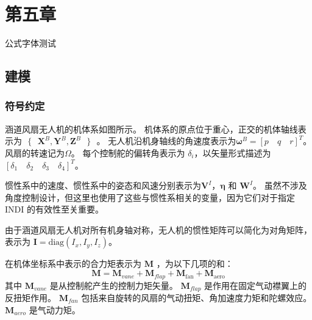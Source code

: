 \chapter{第五章}
公式字体测试

\section{建模}
\label{sec:1}
\subsection{符号约定}
涵道风扇无人机的机体系如图所示。 机体系的原点位于重心，正交的机体轴线表示为$\text{ }\!\!\{\!\!\text{ }{\boldsymbol{X}^{B}},{\boldsymbol{Y}^{B}},{\boldsymbol{Z}^{B}}\text{ }\!\!\}\!\!\text{ }$。 无人机沿机身轴线的角速度表示为${{\boldsymbol{\omega }}^{B}}=[p \quad q \quad r]^{T}$。风扇的转速记为$\Omega$。 每个控制舵的偏转角表示为 ${{\delta }_{i}}$，以矢量形式描述为$[{{\delta }_{1}} \quad {{\delta }_{2}} \quad {{\delta }_{3}} \quad {{\delta }_{4}}]^T$。



惯性系中的速度、惯性系中的姿态和风速分别表示为${{\boldsymbol{V}}^{I}}$，$\boldsymbol{\eta }$ 和 ${{\boldsymbol{W}}^{I}}$。 虽然不涉及角度控制设计，但这里也使用了这些与惯性系相关的变量，因为它们对于指定 INDI 的有效性至关重要。

由于涵道风扇无人机对所有机身轴对称，无人机的惯性矩阵可以简化为对角矩阵，表示为 $ \boldsymbol{I}=\text{diag}({{I}_{x} },{{I}_{y}},{{I}_{z}}) $。

在机体坐标系中表示的合力矩表示为 $\boldsymbol M$ ，为以下几项的和：
\begin{equation}
	{\boldsymbol{M}} = {{\boldsymbol{M}}_{vane}} + {{\boldsymbol{M}}_{flap}} + {{\boldsymbol{M}}_\mathrm{fan}} + {{\boldsymbol{M}}_\text{aero}}
	\label{eq_1}
\end{equation}
其中 $ {{\boldsymbol{M}}_{vane}} $ 是从控制舵产生的控制力矩矢量。 $ {{\boldsymbol{M}}_{flap}} $ 是作用在固定气动襟翼上的反扭矩作用。 $ {{\boldsymbol{M}}_{fan}}$ 包括来自旋转的风扇的气动扭矩、角加速度力矩和陀螺效应。 $ {{\boldsymbol{M}}_{aero}} $ 是气动力矩。

